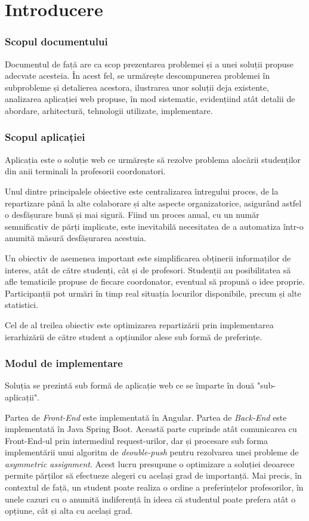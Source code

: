 \chapter*{Introducere} 

\subsection{Scopul documentului}
Documentul de față are ca scop prezentarea problemei și a unei soluții propuse adecvate acesteia. În acest fel, se urmărește descompunerea problemei în subprobleme și detalierea acestora, ilustrarea unor soluții deja existente, analizarea aplicației web propuse, în mod sistematic, evidențiind atât detalii de abordare, arhitectură, tehnologii utilizate, implementare.

\subsection{Scopul aplicației}
Aplicația \textit{\thesistitle{}} este o soluție web ce urmărește să rezolve problema alocării studenților din anii terminali la profesorii coordonatori.

Unul dintre principalele obiective este centralizarea întregului proces, de la repartizare până la alte colaborare și alte aspecte organizatorice, asigurând astfel o desfășurare bună și mai sigură. Fiind un proces anual, cu un număr semnificativ de părți implicate, este inevitabilă necesitatea de a automatiza într-o anumită măsură desfășurarea acestuia.

Un obiectiv de asemenea important este simplificarea obținerii informaților de interes, atât de către studenți, cât și de profesori. Studenții au posibilitatea să afle tematicile propuse de fiecare coordonator, eventual să propună o idee proprie. Participanții pot urmări în timp real situația locurilor disponibile, precum și alte statistici.

Cel de al treilea obiectiv este optimizarea repartizării prin implementarea ierarhizării de către student a opțiunilor alese sub formă de preferințe.

\subsection{Modul de implementare}
Soluția se prezintă sub formă de aplicație web ce se împarte în două "sub-aplicații".

Partea de \textit{Front-End} este implementată în Angular.
Partea de \textit{Back-End} este implementată în Java Spring Boot. Această parte cuprinde atât comunicarea cu Front-End-ul prin intermediul request-urilor, dar și procesare sub forma implementării unui algoritm de \textit{deouble-push} pentru rezolvarea unei probleme de \textit{asymmetric assignment}. Acest lucru presupune o optimizare a soluției deoarece permite părților să efectueze alegeri cu același grad de importanță. Mai precis, în contextul de față, un student poate realiza o ordine a preferințelor profesorilor, în unele cazuri cu o anumită indiferență în ideea că studentul poate prefera atât o opțiune, cât și alta cu același grad.